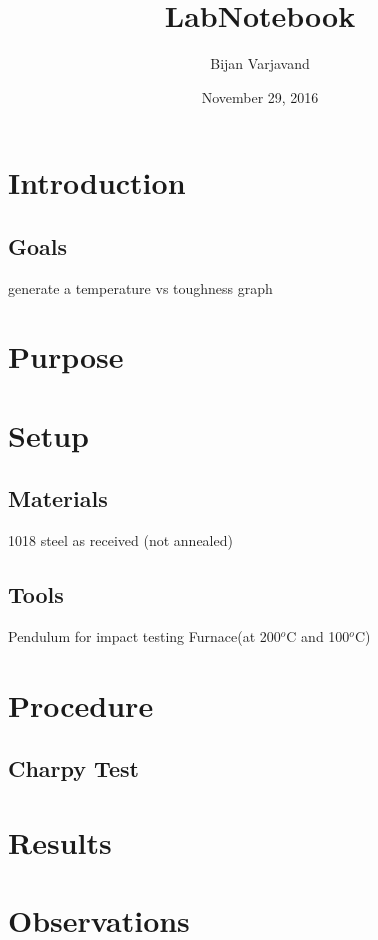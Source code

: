 \documentclass{article}
\author{Bijan Varjavand}
\title{LabNotebook}
\date{November 29, 2016}
\begin{document}
\maketitle

\section{Introduction}

\subsection{Goals}
generate a temperature vs toughness graph

\section{Purpose}

\section{Setup}

\subsection{Materials}
1018 steel as received (not annealed)

\subsection{Tools}
Pendulum for impact testing
Furnace(at 200$^o$C and 100$^o$C)

\section{Procedure}

\subsection{Charpy Test}

\section{Results}

\section{Observations}
\end{document}
